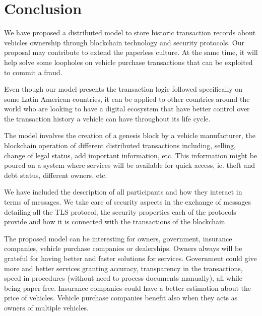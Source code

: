 \section{Conclusion}
We have proposed a distributed model to store historic transaction records about vehicles ownership through blockchain technology and security protocols.
Our proposal may contribute to extend the paperless culture.
At the same time, it will help solve some loopholes on vehicle purchase transactions that can be exploited to commit a fraud. 

Even though our model presents the transaction logic 
followed specifically on some Latin American countries, 
it can be applied to other countries around the world 
who are looking to have a digital ecosystem 
that have better control over the transaction history a vehicle can have 
throughout its life cycle.

The model involves the creation of a genesis block by a vehicle manufacturer,
the blockchain operation of different distributed transactions including, selling,
change of legal status, add important information, etc. 
This information might be poured on a system 
where services will be available for quick access, ie. theft and debt status, 
different owners, etc.

We have included the description of all participants and how they interact in terms of 
messages. 
We take care of security aspects in the exchange of messages 
detailing all the TLS protocol, the security properties each of the protocols provide and how it is connected with the transactions of the blockchain.

The proposed model can be interesting for owners, government, insurance companies, 
vehicle purchase companies or dealerships. 
Owners always will be grateful for having better and faster solutions for services. 
Government could give more and better services granting accuracy, transparency in the transactions, 
speed in procedures (without need to process documents manually), all while being paper free. 
Insurance companies could have a better estimation about the price of vehicles. 
Vehicle purchase companies benefit also when they acts as owners of multiple vehicles.

